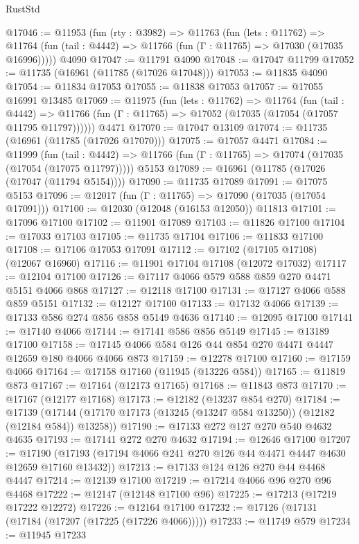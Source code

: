 \begin{lexlean}{RustStd}
\begin{coremodule}
@17046 := @11953
    (fun (rty : @3982) =>
    @11763
      (fun (lets : @11762) =>
      @11764 (fun (tail : @4442) => @11766 (fun (Γ : @11765) => @17030 (@17035 @16996)))))
    @4090
@17047 := @11791 @4090
@17048 := @17047 @11799
@17052 := @11735 (@16961 (@11785 (@17026 @17048)))
@17053 := @11835 @4090
@17054 := @11834 @17053
@17055 := @11838 @17053
@17057 := @17055 @16991 @13485
@17069 := @11975
    (fun (lets : @11762) =>
    @11764
      (fun (tail : @4442) =>
      @11766 (fun (Γ : @11765) => @17052 (@17035 (@17054 (@17057 @11795 @11797))))))
    @4471
@17070 := @17047 @13109
@17074 := @11735 (@16961 (@11785 (@17026 @17070)))
@17075 := @17057 @4471
@17084 := @11999
    (fun (tail : @4442) => @11766 (fun (Γ : @11765) => @17074 (@17035 (@17054 (@17075 @11797)))))
    @5153
@17089 := @16961 (@11785 (@17026 (@17047 (@11794 @5154))))
@17090 := @11735 @17089
@17091 := @17075 @5153
@17096 := @12017 (fun (Γ : @11765) => @17090 (@17035 (@17054 @17091)))
@17100 := @12030 (@12048 (@16153 @12050)) @11813
@17101 := @17096 @17100
@17102 := @11901 @17089
@17103 := @11826 @17100
@17104 := @17033 @17103
@17105 := @11735 @17104
@17106 := @11833 @17100
@17108 := @17106 @17053 @17091
@17112 := @17102 (@17105 @17108) (@12067 @16960)
@17116 := @11901 @17104 @17108 (@12072 @17032)
@17117 := @12104 @17100
@17126 := @17117 @4066 @579 @588 @859 @270 @4471 @5151 @4066 @868
@17127 := @12118 @17100
@17131 := @17127 @4066 @588 @859 @5151
@17132 := @12127 @17100
@17133 := @17132 @4066
@17139 := @17133 @586 @274 @856 @858 @5149 @4636
@17140 := @12095 @17100
@17141 := @17140 @4066
@17144 := @17141 @586 @856 @5149
@17145 := @13189 @17100
@17158 := @17145 @4066 @584 @126 @44 @854 @270 @4471 @4447 @12659 @180 @4066 @4066 @873
@17159 := @12278 @17100
@17160 := @17159 @4066
@17164 := @17158 @17160 (@11945 (@13226 @584))
@17165 := @11819 @873
@17167 := @17164 (@12173 @17165)
@17168 := @11843 @873
@17170 := @17167 (@12177 @17168)
@17173 := @12182 (@13237 @854 @270)
@17184 := @17139
    (@17144 (@17170 @17173 (@13245 (@13247 @584 @13250)) (@12182 (@12184 @584)) @13258))
@17190 := @17133 @272 @127 @270 @540 @4632 @4635
@17193 := @17141 @272 @270 @4632
@17194 := @12646 @17100
@17207 := @17190 (@17193 (@17194 @4066 @241 @270 @126 @44 @4471 @4447 @4630 @12659 @17160 @13432))
@17213 := @17133 @124 @126 @270 @44 @4468 @4447
@17214 := @12139 @17100
@17219 := @17214 @4066 @96 @270 @96 @4468
@17222 := @12147 (@12148 @17100 @96)
@17225 := @17213 (@17219 @17222 @12272)
@17226 := @12164 @17100
@17232 := @17126 (@17131 (@17184 (@17207 (@17225 (@17226 @4066)))))
@17233 := @11749 @579
@17234 := @11945 @17233

\end{coremodule}
\end{lexlean}
